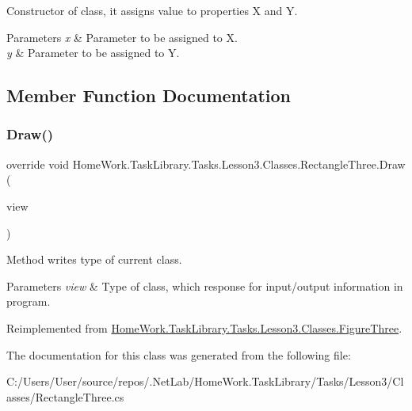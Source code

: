 Constructor of class, it assigns value to properties X and Y. 


\begin{DoxyParams}{Parameters}
{\em x} & Parameter to be assigned to X.\\
\hline
{\em y} & Parameter to be assigned to Y.\\
\hline
\end{DoxyParams}


\subsection{Member Function Documentation}
\mbox{\label{class_home_work_1_1_task_library_1_1_tasks_1_1_lesson3_1_1_classes_1_1_rectangle_three_a8d5829e8082b1f5e8adbf8ecf91c6f70}} 
\subsubsection{\texorpdfstring{Draw()}{Draw()}}
{\footnotesize\ttfamily override void Home\+Work.\+Task\+Library.\+Tasks.\+Lesson3.\+Classes.\+Rectangle\+Three.\+Draw (\begin{DoxyParamCaption}\item[{I\+Information}]{view }\end{DoxyParamCaption})\hspace{0.3cm}{\ttfamily [virtual]}}



Method writes type of current class. 


\begin{DoxyParams}{Parameters}
{\em view} & Type of class, which response for input/output information in program.\\
\hline
\end{DoxyParams}


Reimplemented from \mbox{\hyperlink{class_home_work_1_1_task_library_1_1_tasks_1_1_lesson3_1_1_classes_1_1_figure_three_a1dc44301b6143d7ec6e7089ed13d460e}{Home\+Work.\+Task\+Library.\+Tasks.\+Lesson3.\+Classes.\+Figure\+Three}}.



The documentation for this class was generated from the following file\+:\begin{DoxyCompactItemize}
\item 
C\+:/\+Users/\+User/source/repos/.\+Net\+Lab/\+Home\+Work.\+Task\+Library/\+Tasks/\+Lesson3/\+Classes/Rectangle\+Three.\+cs\end{DoxyCompactItemize}
